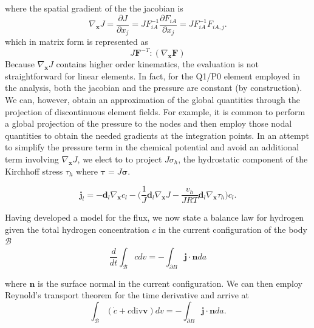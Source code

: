 \documentclass[10pt]{elsarticle}
\newcommand{\mbs}[1]{\boldsymbol{#1}}
\def\bs{{\mbs{s}}} \def\bt{{\mbs{t}}} \def\bu{{\mbs{u}}}
\def\bs{\boldsymbol}
\begin{document}
%
where the spatial gradient of the the jacobian is 
%
\begin{equation}
\label{eq.gradJ}{ \nabla_{\bs{x}}J} = \frac {\partial J} {\partial x_j} = J F^{-1}_{iA} \frac {\partial F_{iA}} {\partial x_j} = J F^{-1}_{iA} F_{iA,j}.
\end{equation}
which in matrix form is represented as
%
\begin{equation}
J \boldsymbol{F}^{-T}:(\nabla_{\boldsymbol{x}} \boldsymbol{F})
\end{equation}
%
Because $\nabla_{\bs{x}}J$ contains higher order kinematics, the evaluation is not straightforward for linear elements. In fact, for the Q1/P0 element employed in the analysis, both the jacobian and the pressure are constant (by construction). We can, however, obtain an approximation of the global quantities through the projection of discontinuous element fields.  For example, it is common to perform a global projection of the pressure to the nodes and then employ those nodal quantities to obtain the needed gradients at the integration points. In an attempt to simplify the pressure term in the chemical potential and avoid an additional term involving $\nabla_{\bs{x}}J$, we elect to to project $J \sigma_{h}$,  the hydrostatic component of the Kirchhoff stress $\tau_{h}$ where $\bs{\tau} = J \bs{\sigma}$.

%
\begin{equation}
\label{eq.flux3}{\bs{j}_{l} = -\bs{d}_{l}  \nabla_{\bs{x}}c_{l}  - \bigg(\frac{1}{J} \bs{d}_{l} \nabla_{\bs{x}}J -  \frac{v_{h}}{JR T} \bs{d}_{l} \nabla_{\bs{x}} \tau_{h}}\bigg)c_{l}.
\end{equation}

Having developed a model for the flux, we now state a balance law for hydrogen given the total hydrogen concentration $c$ in the current configuration of the body $\mathcal{B}$
%
\begin{equation}
\label{eq.hconservation} \frac{d}{dt} \int_{\mathcal{B}} c dv = -\int_{\partial B} \bs{j} \cdot \bs{n} da 
\end{equation}
%

where $\bs{n}$ is the surface normal in the current configuration. We can then employ Reynold's transport theorem for the time derivative and arrive at 
%
\begin{equation}
\label{eq.hconservation2}  \int_{\mathcal{B}} (\dot{c} + c\text{div}\bs{v}) dv = -\int_{\partial B} \bs{j} \cdot \bs{n} da.
\end{equation}   
%
\end{document}
